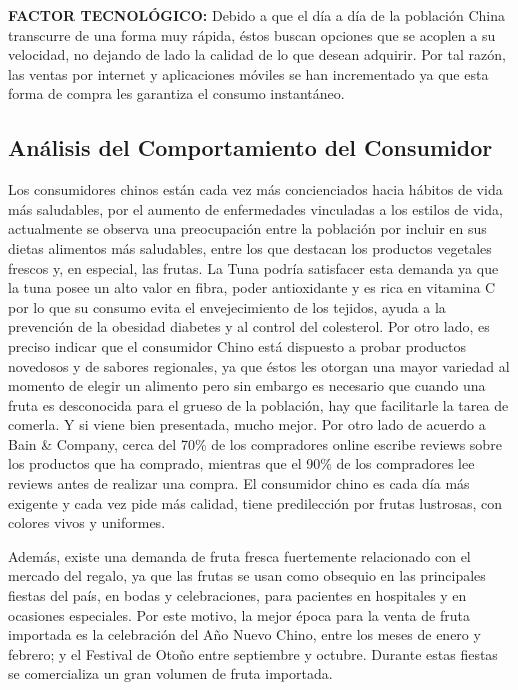 \documentclass[
  stu,
  floatsintext,
  longtable,
  a4paper,
  nolmodern,
  notxfonts,
  notimes,
  12pt,
  colorlinks=true,linkcolor=blue,citecolor=blue,urlcolor=blue]{apa7}
\begin{document}
\textbf{FACTOR TECNOLÓGICO:} Debido a que el día a día de la población
China transcurre de una forma muy rápida, éstos buscan opciones que se
acoplen a su velocidad, no dejando de lado la calidad de lo que desean
adquirir. Por tal razón, las ventas por internet y aplicaciones móviles
se han incrementado ya que esta forma de compra les garantiza el consumo
instantáneo.

\subsection{Análisis del Comportamiento del
Consumidor}\label{anuxe1lisis-del-comportamiento-del-consumidor}

Los consumidores chinos están cada vez más concienciados hacia hábitos
de vida más saludables, por el aumento de enfermedades vinculadas a los
estilos de vida, actualmente se observa una preocupación entre la
población por incluir en sus dietas alimentos más saludables, entre los
que destacan los productos vegetales frescos y, en especial, las frutas.
La Tuna podría satisfacer esta demanda ya que la tuna posee un alto
valor en fibra, poder antioxidante y es rica en vitamina C por lo que su
consumo evita el envejecimiento de los tejidos, ayuda a la prevención de
la obesidad diabetes y al control del colesterol. Por otro lado, es
preciso indicar que el consumidor Chino está dispuesto a probar
productos novedosos y de sabores regionales, ya que éstos les otorgan
una mayor variedad al momento de elegir un alimento pero sin embargo es
necesario que cuando una fruta es desconocida para el grueso de la
población, hay que facilitarle la tarea de comerla. Y si viene bien
presentada, mucho mejor. Por otro lado de acuerdo a Bain \& Company,
cerca del 70\% de los compradores online escribe reviews sobre los
productos que ha comprado, mientras que el 90\% de los compradores lee
reviews antes de realizar una compra. El consumidor chino es cada día
más exigente y cada vez pide más calidad, tiene predilección por frutas
lustrosas, con colores vivos y uniformes.

Además, existe una demanda de fruta fresca fuertemente relacionado con
el mercado del regalo, ya que las frutas se usan como obsequio en las
principales fiestas del país, en bodas y celebraciones, para pacientes
en hospitales y en ocasiones especiales. Por este motivo, la mejor época
para la venta de fruta importada es la celebración del Año Nuevo Chino,
entre los meses de enero y febrero; y el Festival de Otoño entre
septiembre y octubre. Durante estas fiestas se comercializa un gran
volumen de fruta importada.
\end{document}
